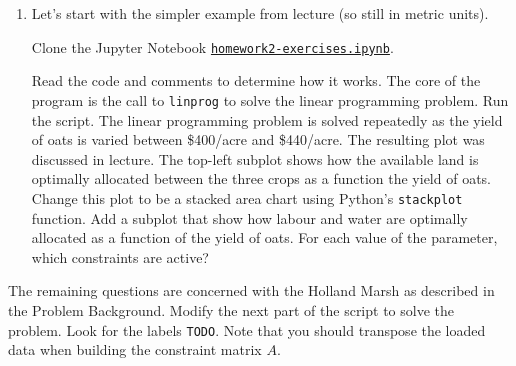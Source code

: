 \documentclass[letter]{article}
\begin{document}
\begin{enumerate}[label=\textbf{\arabic*.}]
	\item Let's start with the simpler example from lecture (so still in metric units). 

	Clone the Jupyter Notebook \href{https://utoronto.syzygy.ca/jupyter/user-redirect/git-pull?repo=https://github.com/bigfatbernie/IBLMathModeling&subPath=homeworks/homework2/homework2-exercises.ipynb}{\tt homework2-exercises.ipynb}.
	
	Read the code and comments to determine how it works. The core of the program is the call to \verb|linprog| to solve the linear programming problem. Run the script. The linear programming problem is solved repeatedly as the yield of oats is varied between \$400/acre and \$440/acre. The resulting plot was discussed in lecture. The top-left subplot shows how the available land is optimally allocated between the three crops as a function the yield of oats. Change this plot to be a stacked area chart using Python's \verb|stackplot| function. Add a subplot that show how labour and water are optimally allocated as a function of the yield of oats. For each value of the parameter, which constraints are active? 
\end{enumerate}

The remaining questions are concerned with the Holland Marsh as described in the Problem Background. 
	Modify the next part of the script to solve the problem. Look for the labels \verb|TODO|. 
	Note that you should transpose the loaded data when building the constraint matrix $A$.
\end{document}
